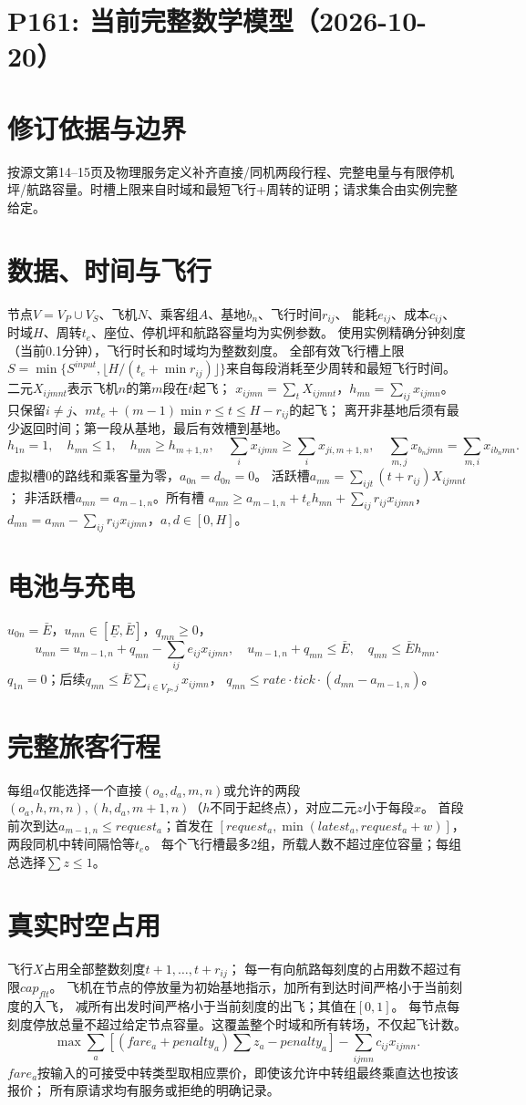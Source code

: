 \documentclass[11pt]{ctexart}
\begin{document}
\section*{P161: 当前完整数学模型（2026-10-20）}
\section*{修订依据与边界}按源文第14–15页及物理服务定义补齐直接/同机两段行程、完整电量与有限停机坪/航路容量。时槽上限来自时域和最短飞行+周转的证明；请求集合由实例完整给定。

\section*{数据、时间与飞行}
节点$V=V_P\cup V_S$、飞机$N$、乘客组$A$、基地$b_n$、飞行时间$r_{ij}$、
能耗$e_{ij}$、成本$c_{ij}$、时域$H$、周转$t_e$、座位、停机坪和航路容量均为实例参数。
使用实例精确分钟刻度（当前0.1分钟），飞行时长和时域均为整数刻度。
全部有效飞行槽上限
$S=\min\{S^{input},\lfloor H/(t_e+\min r_{ij})\rfloor\}$来自每段消耗至少周转和最短飞行时间。
二元$X_{ijmnt}$表示飞机$n$的第$m$段在$t$起飞；
$x_{ijmn}=\sum_tX_{ijmnt}$，$h_{mn}=\sum_{ij}x_{ijmn}$。
只保留$i\ne j$、$mt_e+(m-1)\min r\le t\le H-r_{ij}$的起飞；
离开非基地后须有最少返回时间；第一段从基地，最后有效槽到基地。
\[
h_{1n}=1,\quad h_{mn}\le1,\quad h_{mn}\ge h_{m+1,n},\quad
\sum_ix_{ijmn}\ge\sum_ix_{ji,m+1,n},
\quad\sum_{m,j}x_{b_njmn}=\sum_{m,i}x_{ib_nmn}.
\]
虚拟槽0的路线和乘客量为零，$a_{0n}=d_{0n}=0$。
活跃槽$a_{mn}=\sum_{ijt}(t+r_{ij})X_{ijmnt}$；
非活跃槽$a_{mn}=a_{m-1,n}$。所有槽
$a_{mn}\ge a_{m-1,n}+t_eh_{mn}+\sum_{ij}r_{ij}x_{ijmn}$，
$d_{mn}=a_{mn}-\sum_{ij}r_{ij}x_{ijmn}$，$a,d\in[0,H]$。
\section*{电池与充电}
$u_{0n}=\bar E$，$u_{mn}\in[\underline E,\bar E]$，$q_{mn}\ge0$，
\[
u_{mn}=u_{m-1,n}+q_{mn}-\sum_{ij}e_{ij}x_{ijmn},\quad
u_{m-1,n}+q_{mn}\le\bar E,\quad q_{mn}\le\bar Eh_{mn}.
\]
$q_{1n}=0$；后续$q_{mn}\le\bar E\sum_{i\in V_P,j}x_{ijmn}$，
$q_{mn}\le rate\cdot tick\cdot(d_{mn}-a_{m-1,n})$。
\section*{完整旅客行程}
每组$a$仅能选择一个直接$(o_a,d_a,m,n)$或允许的两段
$(o_a,h,m,n),(h,d_a,m+1,n)$（$h$不同于起终点），对应二元$z$小于每段$x$。
首段前次到达$a_{m-1,n}\le request_a$；首发在
$[request_a,\min(latest_a,request_a+w)]$，两段同机中转间隔恰等$t_e$。
每个飞行槽最多2组，所载人数不超过座位容量；每组总选择$\sum z\le1$。
\section*{真实时空占用}
飞行$X$占用全部整数刻度$t+1,\ldots,t+r_{ij}$；
每一有向航路每刻度的占用数不超过有限$cap_{flt}$。
飞机在节点的停放量为初始基地指示，加所有到达时间严格小于当前刻度的入飞，
减所有出发时间严格小于当前刻度的出飞；其值在$[0,1]$。
每节点每刻度停放总量不超过给定节点容量。这覆盖整个时域和所有转场，不仅起飞计数。
\[
\max\sum_a[(fare_a+penalty_a)\sum z_a-penalty_a]
-\sum_{ijmn}c_{ij}x_{ijmn}.
\]
$fare_a$按输入的可接受中转类型取相应票价，即使该允许中转组最终乘直达也按该报价；
所有原请求均有服务或拒绝的明确记录。
\end{document}
